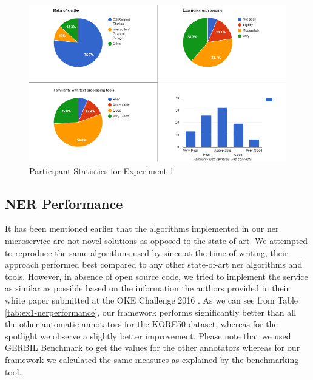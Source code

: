 \begin{figure}[]
  \includegraphics[width=\linewidth]{figures/experiment1/ex1-prequestionnairestats.PNG}
  \caption{Participant Statistics for Experiment 1}
  \label{fig:ex1-preqestionnaire}
\end{figure}

\subsection{NER Performance}
It has been mentioned earlier that the algorithms implemented in our \ac{ner} microservice are not novel solutions as opposed to the state-of-art. We attempted to reproduce the same algorithms used by \cite{39} since at the time of writing, their approach performed best compared to any other state-of-art \ac{ner} algorithms and tools. However, in absence of open source code, we tried to implement the service as similar as possible based on the information the authors provided in their white paper submitted at the OKE Challenge 2016 \cite{39}. As we can see from Table \ref{tab:ex1-nerperformance}, our framework performs significantly better than all the other automatic annotators for the KORE50 dataset, whereas for the spotlight we observe a slightly better improvement. Please note that we used GERBIL Benchmark \cite{40} to get the values for the other annotators whereas for our framework we calculated the same measures as explained by the benchmarking tool. 

